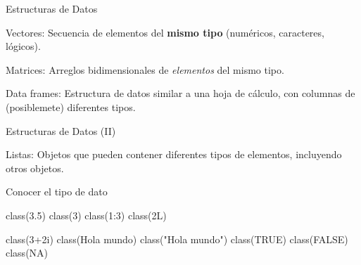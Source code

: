 \documentclass[
  ignorenonframetext,
  aspectratio=169,
  spanish,
]{beamer}
\newenvironment{Shaded}{\begin{snugshade}}{\end{snugshade}}
\newcommand{\ConstantTok}[1]{\textcolor[rgb]{0.56,0.35,0.01}{#1}}
\newcommand{\DecValTok}[1]{\textcolor[rgb]{0.68,0.00,0.00}{#1}}
\newcommand{\FloatTok}[1]{\textcolor[rgb]{0.68,0.00,0.00}{#1}}
\newcommand{\FunctionTok}[1]{\textcolor[rgb]{0.28,0.35,0.67}{#1}}
\newcommand{\NormalTok}[1]{\textcolor[rgb]{0.00,0.23,0.31}{#1}}
\newcommand{\SpecialCharTok}[1]{\textcolor[rgb]{0.37,0.37,0.37}{#1}}
\newcommand{\StringTok}[1]{\textcolor[rgb]{0.13,0.47,0.30}{#1}}
\begin{document}
\begin{frame}{Estructuras de Datos}
\label{estructuras-de-datos}
\begin{block}{Vectores:}
\label{vectores}
Secuencia de elementos del \textbf{mismo tipo} (numéricos, caracteres,
lógicos).
\end{block}

\begin{block}{Matrices:}
\label{matrices}
Arreglos bidimensionales de \emph{elementos} del mismo tipo.
\end{block}

\begin{block}{Data frames:}
\label{data-frames}
Estructura de datos similar a una hoja de cálculo, con columnas de
(posiblemete) diferentes tipos.
\end{block}
\end{frame}

\begin{frame}{Estructuras de Datos (II)}
\label{estructuras-de-datos-ii}
\begin{block}{Listas:}
\label{listas}
Objetos que pueden contener diferentes tipos de elementos, incluyendo
otros objetos.
\end{block}
\end{frame}

\begin{frame}[fragile]{Conocer el tipo de dato}
\label{conocer-el-tipo-de-dato}
\begin{Shaded}
\begin{Highlighting}[numbers=left,,]
\FunctionTok{class}\NormalTok{(}\FloatTok{3.5}\NormalTok{)}
\FunctionTok{class}\NormalTok{(}\DecValTok{3}\NormalTok{)}
\FunctionTok{class}\NormalTok{(}\DecValTok{1}\SpecialCharTok{:}\DecValTok{3}\NormalTok{)}
\FunctionTok{class}\NormalTok{(}\DecValTok{2}\NormalTok{L)}
\end{Highlighting}
\end{Shaded}

\begin{Shaded}
\begin{Highlighting}[numbers=left,,]
\FunctionTok{class}\NormalTok{(}\DecValTok{3}\SpecialCharTok{+}\DecValTok{2}\NormalTok{i)}
\FunctionTok{class}\NormalTok{(}\StringTok{\textquotesingle{}Hola mundo\textquotesingle{}}\NormalTok{)}
\FunctionTok{class}\NormalTok{(}\StringTok{"Hola mundo"}\NormalTok{)}
\FunctionTok{class}\NormalTok{(}\ConstantTok{TRUE}\NormalTok{)}
\FunctionTok{class}\NormalTok{(}\ConstantTok{FALSE}\NormalTok{) }
\FunctionTok{class}\NormalTok{(}\ConstantTok{NA}\NormalTok{)  }
\end{Highlighting}
\end{Shaded}
\end{frame}
\end{document}
